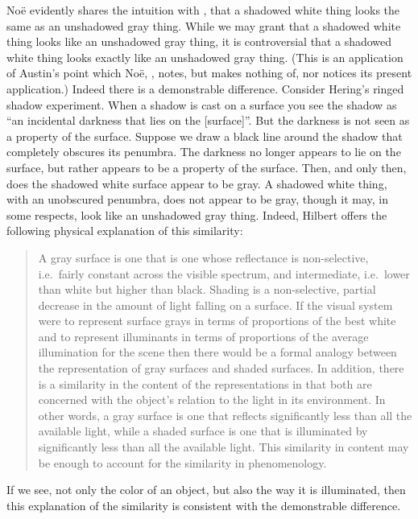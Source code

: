 \documentclass[12pt]{article}
\begin{document}
Noë evidently shares the intuition with \citet[88]{Chalmers:2006kx}, that a shadowed white thing looks the same as an unshadowed gray thing. While we may grant that a shadowed white thing looks like an unshadowed gray thing, it is controversial that a shadowed white thing looks exactly like an unshadowed gray thing. (This is an application of Austin's point which Noë, \citeyear[80]{Noe:2004fk}, notes, but makes nothing of, nor notices its present application.) Indeed there is a demonstrable difference. Consider Hering's \citeyearpar[8]{Hering:1920ty} ringed shadow experiment. When a shadow is cast on a surface you see the shadow as ``an incidental darkness that lies on the [surface]''. But the darkness is not seen as a property of the surface. Suppose we draw a black line around the shadow that completely obscures its penumbra. The darkness no longer appears to lie on the surface, but rather appears to be a property of the surface. Then, and only then, does the shadowed white surface appear to be gray. A shadowed white thing, with an unobscured penumbra, does not appear to be gray, though it may, in some respects, look like an unshadowed gray thing. Indeed, Hilbert offers the following physical explanation of this similarity:
	\begin{quote}
		A gray surface is one that is one whose reflectance is non-selective, i.e.\ fairly constant across the visible spectrum, and intermediate, i.e.\ lower than white but higher than black. Shading is a non-selective, partial decrease in the amount of light falling on a surface. If the visual system were to represent surface grays in terms of proportions of the best white and to represent illuminants in terms of proportions of the average illumination for the scene then there would be a formal analogy between the representation of gray surfaces and shaded surfaces. In addition, there is a similarity in the content of the representations in that both are concerned with the object’s relation to the light in its environment. In other words, a gray surface is one that reflects significantly less than all the available light, while a shaded surface is one that is illuminated by significantly less than all the available light. This similarity in content may be enough to account for the similarity in phenomenology. \citep[xx]{Hilbert:2007qy}
	\end{quote}
If we see, not only the color of an object, but also the way it is illuminated, then this explanation of the similarity is consistent with the demonstrable difference.
\end{document}
